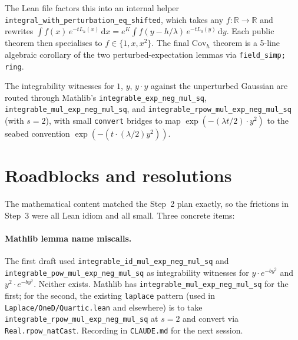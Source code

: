 \documentclass[11pt]{article}
\begin{document}
The Lean file factors this into an internal helper
\texttt{integral\_with\_perturbation\_eq\_shifted}, which takes any
$f : \mathbb{R} \to \mathbb{R}$ and rewrites
$\int f(x)\, e^{-tL_h(x)}\,\mathrm{d}x =
  e^K \int f(y - h/\lambda)\, e^{-tL_0(y)}\,\mathrm{d}y$.
Each public theorem then specialises to $f \in \{1, x, x^2\}$. The
final $\mathrm{Cov}_h$ theorem is a 5-line algebraic corollary of the
two perturbed-expectation lemmas via \texttt{field\_simp; ring}.

The integrability witnesses for $1$, $y$, $y \cdot y$ against the
unperturbed Gaussian are routed through Mathlib's
\texttt{integrable\_exp\_neg\_mul\_sq},
\texttt{integrable\_mul\_exp\_neg\_mul\_sq}, and
\texttt{integrable\_rpow\_mul\_exp\_neg\_mul\_sq} (with $s = 2$), with
small \texttt{convert} bridges to map $\exp(-(\lambda t/2)\cdot y^2)$
to the seabed convention $\exp(-(t \cdot (\lambda/2) y^2))$.

\section{Roadblocks and resolutions}

The mathematical content matched the Step~2 plan exactly, so the
frictions in Step~3 were all Lean idiom and all small. Three concrete
items:

\paragraph{Mathlib lemma name miscalls.} The first draft used
\texttt{integrable\_id\_mul\_exp\_neg\_mul\_sq} and
\texttt{integrable\_pow\_mul\_exp\_neg\_mul\_sq} as integrability
witnesses for $y \cdot e^{-by^2}$ and $y^2 \cdot e^{-by^2}$. Neither
exists. Mathlib has \texttt{integrable\_mul\_exp\_neg\_mul\_sq} for
the first; for the second, the existing \texttt{laplace} pattern
(used in \texttt{Laplace/OneD/Quartic.lean} and elsewhere) is to take
\texttt{integrable\_rpow\_mul\_exp\_neg\_mul\_sq} at $s = 2$ and
convert via \texttt{Real.rpow\_natCast}. Recording in
\texttt{CLAUDE.md} for the next session.
\end{document}
